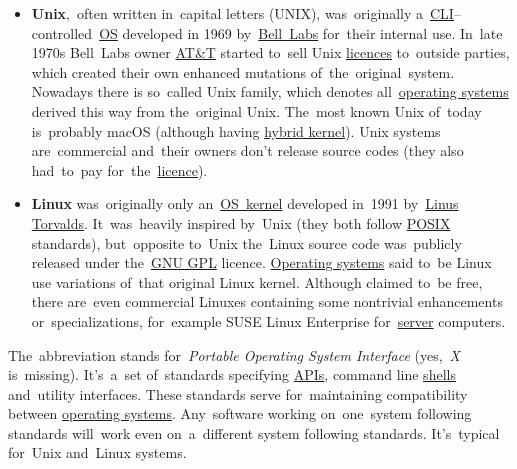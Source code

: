 \label{linux}

\label{unixlinux}
\begin{itemize}
    \item \textbf{Unix},~often written in~capital letters (UNIX), was~originally a~\hyperref[shellcligui]{CLI}--controlled~\hyperref[os]{OS} developed in 1969 by~\href{https://en.wikipedia.org/wiki/Bell_Labs}{Bell~Labs} for~their internal use.
          In~late 1970s Bell~Labs owner \href{https://en.wikipedia.org/wiki/AT\%26T}{AT\&T} started to~sell Unix \hyperref[licencing]{licences} to~outside parties, which created their own enhanced mutations of~the~original~system.
          Nowadays there is so~called Unix family, which denotes all~\hyperref[os]{operating systems} derived this way from the~original Unix.
          The~most known Unix of~today is~probably macOS (although having \hyperref[hybridkernel]{hybrid kernel}). \warningnonl Unix systems are~commercial and~their owners don't release source codes (they also had~to~pay for~the~\hyperref[licencing]{licence}).
    \item \textbf{Linux} was~originally only an~\hyperref[kernel]{OS~kernel} developed in~1991 by~\href{https://en.wikipedia.org/wiki/Linus_Torvalds}{Linus Torvalds}.
          It~was~heavily inspired by~Unix (they both follow \hyperref[posix]{POSIX} standards), but~opposite to~Unix the~Linux source code was~publicly released under the~\hyperref[gpl]{GNU GPL} licence. \hyperref[os]{Operating systems} said to~be Linux use variations of~that original Linux kernel.
          Although claimed to~be free, there are~even commercial Linuxes containing some nontrivial enhancements or~specializations, for~example SUSE Linux Enterprise for~\hyperref[server]{server} computers.
\end{itemize}

\label{posix}
The~abbreviation stands for~\textit{Portable Operating System Interface} (yes,~\textit{X} is~missing).
It's~a~set of~standards specifying \hyperref[api]{APIs}, command line \hyperref[shellcligui]{shells} and~utility interfaces.
These standards serve for~maintaining compatibility between \hyperref[os]{operating systems}.
Any~software working on~one~system following standards will~work even on~a~different system following standards.
It's~typical for~Unix and~Linux systems.
\newpage

